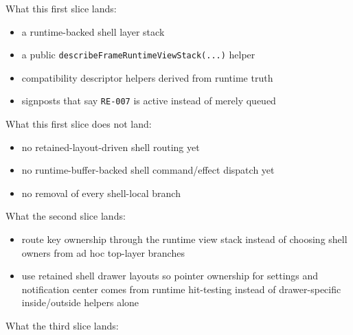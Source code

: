What this first slice lands:

\begin{itemize}
\tightlist
\item
  a runtime-backed shell layer stack
\item
  a public \texttt{d\allowbreak{}e\allowbreak{}s\allowbreak{}c\allowbreak{}r\allowbreak{}i\allowbreak{}b\allowbreak{}e\allowbreak{}F\allowbreak{}r\allowbreak{}a\allowbreak{}m\allowbreak{}e\allowbreak{}R\allowbreak{}u\allowbreak{}n\allowbreak{}t\allowbreak{}i\allowbreak{}m\allowbreak{}e\allowbreak{}V\allowbreak{}i\allowbreak{}e\allowbreak{}w\allowbreak{}S\allowbreak{}t\allowbreak{}a\allowbreak{}c\allowbreak{}k\allowbreak{}(\allowbreak{}.\allowbreak{}.\allowbreak{}.\allowbreak{})} helper
\item
  compatibility descriptor helpers derived from runtime truth
\item
  signposts that say \texttt{R\allowbreak{}E\allowbreak{}-\allowbreak{}0\allowbreak{}0\allowbreak{}7} is active instead of merely queued
\end{itemize}

What this first slice does not land:

\begin{itemize}
\tightlist
\item
  no retained-layout-driven shell routing yet
\item
  no runtime-buffer-backed shell command/effect dispatch yet
\item
  no removal of every shell-local branch
\end{itemize}

What the second slice lands:

\begin{itemize}
\tightlist
\item
  route key ownership through the runtime view stack instead of choosing shell owners from ad hoc top-layer branches
\item
  use retained shell drawer layouts so pointer ownership for settings and notification center comes from runtime hit-testing instead of drawer-specific inside/outside helpers alone
\end{itemize}

What the third slice lands:

